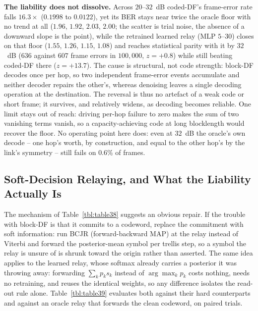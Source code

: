 \textbf{The liability does not dissolve.} Across $20$--$32$~dB coded-DF's frame-error rate falls $16.3\times$ ($0.1998$ to $0.0122$), yet its BER stays near twice the oracle floor with no trend at all ($1.96$, $1.92$, $2.03$, $2.00$; the scatter is trial noise, the absence of a downward slope is the point), while the retrained learned relay (MLP $5$--$30$) closes on that floor ($1.55$, $1.26$, $1.15$, $1.08$) and reaches statistical parity with it by $32$~dB ($636$ against $607$ frame errors in $100{,}000$, $z=+0.8$) while still beating coded-DF there ($z=+13.7$). The cause is structural, not code strength: block-DF decodes once per hop, so two independent frame-error events accumulate and neither decoder repairs the other's, whereas denoising leaves a single decoding operation at the destination. The reversal is thus no artefact of a weak code or short frame; it survives, and relatively widens, as decoding becomes reliable. One limit stays out of reach: driving per-hop failure to zero makes the sum of two vanishing terms vanish, so a capacity-achieving code at long blocklength would recover the floor. No operating point here does: even at $32$~dB the oracle's own decode -- one hop's worth, by construction, and equal to the other hop's by the link's symmetry -- still fails on $0.6\%$ of frames.

\subsection{Soft-Decision Relaying, and What the Liability Actually Is}\label{sec:coded-soft-decision}

The mechanism of Table~\ref{tbl:table38} suggests an obvious repair. If the trouble with block-DF is that it commits to a codeword, replace the commitment with soft information: run BCJR (forward-backward MAP) at the relay instead of Viterbi and forward the posterior-mean symbol per trellis step, so a symbol the relay is unsure of is shrunk toward the origin rather than asserted. The same idea applies to the learned relay, whose softmax already carries a posterior it was throwing away: forwarding $\sum_k p_k s_k$ instead of $\arg\max_k p_k$ costs nothing, needs no retraining, and reuses the identical weights, so any difference isolates the read-out rule alone. Table~\ref{tbl:table39} evaluates both against their hard counterparts and against an oracle relay that forwards the clean codeword, on paired trials.

